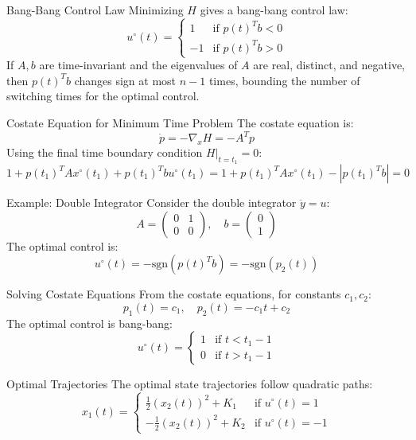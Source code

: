 \documentclass[10pt]{beamer}
\begin{document}
\begin{frame}[fragile]{Bang-Bang Control Law}
  Minimizing \( H \) gives a bang-bang control law:
  \[
  u^\circ(t) = \begin{cases}
  1 & \text{if } p(t)^T b < 0 \\
  -1 & \text{if } p(t)^T b > 0
  \end{cases}
  \]
  If \( A, b \) are time-invariant and the eigenvalues of \( A \) are real, distinct, and negative, then \( p(t)^T b \) changes sign at most \( n - 1 \) times, bounding the number of switching times for the optimal control.
\end{frame}
  
\begin{frame}[fragile]{Costate Equation for Minimum Time Problem}
  The costate equation is:
  \[
  \dot{p} = -\nabla_x H = -A^T p
  \]
  Using the final time boundary condition \( H|_{t=t_1} = 0 \):
  \[
  1 + p(t_1)^T A x^\circ(t_1) + p(t_1)^T b u^\circ(t_1) = 1 + p(t_1)^T A x^\circ(t_1) - |p(t_1)^T b| = 0
  \]
\end{frame}
  
\begin{frame}[fragile]{Example: Double Integrator}
  Consider the double integrator \( \ddot{y} = u \):
  \[
  A = \begin{pmatrix} 0 & 1 \\ 0 & 0 \end{pmatrix}, \quad b = \begin{pmatrix} 0 \\ 1 \end{pmatrix}
  \]
  The optimal control is:
  \[
  u^\circ(t) = -\text{sgn}(p(t)^T b) = -\text{sgn}(p_2(t))
  \]
\end{frame}
  
\begin{frame}[fragile]{Solving Costate Equations}
  From the costate equations, for constants \( c_1, c_2 \):
  \[
  p_1(t) = c_1, \quad p_2(t) = -c_1 t + c_2
  \]
  The optimal control is bang-bang:
  \[
  u^\circ(t) = \begin{cases}
  1 & \text{if } t < t_1 - 1 \\
  0 & \text{if } t > t_1 - 1
  \end{cases}
  \]
\end{frame}
  
\begin{frame}[fragile]{Optimal Trajectories}
  The optimal state trajectories follow quadratic paths:
  \[
  x_1(t) = \begin{cases}
  \frac{1}{2} (x_2(t))^2 + K_1 & \text{if } u^\circ(t) = 1 \\
  -\frac{1}{2} (x_2(t))^2 + K_2 & \text{if } u^\circ(t) = -1
  \end{cases}
  \]
\end{frame}
\end{document}
